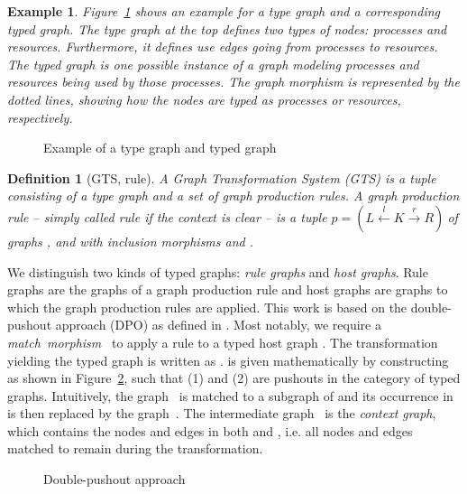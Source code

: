 \documentclass{tlp}
\newtheorem{example}{Example}[section]
\newtheorem{definition}{Definition}[section]
\newcommand{\prodrule}{\ensuremath{p = (L \stackrel{l}{\leftarrow} K
\stackrel{r}{\rightarrow} R)\ }}
\begin{document}
\begin{example}Figure~\ref{fig:type} shows an example for a type graph and a
corresponding typed graph. The type graph at the top defines two types of nodes:
processes and resources. Furthermore, it defines \emph{use} edges going from
processes to resources. The typed graph is one possible instance of a graph
modeling processes and resources being used by those processes. The 
graph morphism is represented by the dotted lines, showing how the nodes are
typed as processes or resources, respectively.
\end{example}

\begin{figure}
\centerline{
}
\caption{Example of a type graph and typed graph}
\label{fig:type}
\end{figure}

\begin{definition}[GTS, rule] A \emph{Graph Transformation System} (GTS) is a
tuple consisting of a type graph and a set of graph production rules. A
\emph{graph production rule} -- simply called \emph{rule} if the context is clear
-- is a tuple \prodrule of graphs , and  with inclusion morphisms  and .
\end{definition}

We distinguish two kinds of typed graphs: \emph{rule graphs} and \emph{host
graphs}. Rule graphs are the graphs  of a graph production rule  and
host graphs are graphs to which the graph production rules are applied. This work
is based on the double-pushout approach (DPO) as defined in
\cite{ehrigprangetaentzer06}. Most notably, we require a \emph{match~morphism}~ to apply a rule  to a typed host graph . The
transformation yielding the typed graph  is written as .  is given mathematically by constructing
 as shown in Figure~\ref{fig:dpo}, such that (1) and (2) are pushouts in the
category of typed graphs. Intuitively, the graph~ is matched to a subgraph of
 and its occurrence in  is then replaced by the graph~. The intermediate
graph~ is the \emph{context graph}, which contains the nodes and edges in
both  and , i.e. all nodes and edges matched to  remain during the
transformation.

\begin{figure} 
 \centerline{
 }
  
 \caption{Double-pushout approach}
 \label{fig:dpo}
\end{figure}
\end{document}
